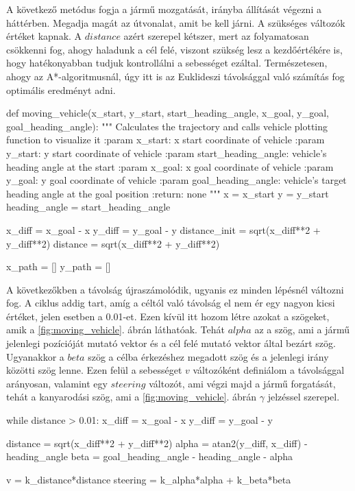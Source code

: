 A következő metódus fogja a jármű mozgatását, irányba állítását végezni a háttérben. Megadja magát az útvonalat, amit be kell járni. A szükséges változók értéket kapnak. A $ distance $ azért szerepel kétszer, mert az folyamatosan csökkenni fog, ahogy haladunk a cél felé, viszont szükség lesz a kezdőértékére is, hogy hatékonyabban tudjuk kontrollálni a sebességet ezáltal. Természetesen, ahogy az A*-algoritmusnál, úgy itt is az Euklideszi távolsággal való számítás fog optimális eredményt adni.
\begin{python}
def moving_vehicle(x_start, y_start, start_heading_angle, x_goal,
 y_goal, goal_heading_angle):
    """
    Calculates the trajectory and calls vehicle plotting
    function to visualize it
    :param x_start: x start coordinate of vehicle
    :param y_start: y start coordinate of vehicle
    :param start_heading_angle: vehicle's heading angle at the start
    :param x_goal: x goal coordinate of vehicle
    :param y_goal: y goal coordinate of vehicle
    :param goal_heading_angle: vehicle's target heading angle
    at the goal position
    :return: none
    """
    x = x_start
    y = y_start
    heading_angle = start_heading_angle

    x_diff = x_goal - x
    y_diff = y_goal - y
    distance_init = sqrt(x_diff**2 + y_diff**2)
    distance = sqrt(x_diff**2 + y_diff**2)

    x_path = []
    y_path = []
\end{python}

\bigskip

A következőkben a távolság újraszámolódik, ugyanis ez minden lépésnél változni fog. A ciklus addig tart, amíg a céltól való távolság el nem ér egy nagyon kicsi értéket, jelen esetben a 0.01-et. Ezen kívül itt hozom létre azokat a szögeket, amik a \ref{fig:moving_vehicle}. ábrán láthatóak. Tehát $ alpha $ az a szög, ami a jármű jelenlegi pozícióját mutató vektor és a cél felé mutató vektor által bezárt szög. Ugyanakkor a $ beta $ szög a célba érkezéshez megadott szög és a jelenlegi irány közötti szög lenne. Ezen felül a sebességet $ v $ változóként definiálom a távolsággal arányosan, valamint egy $ steering $ változót, ami végzi majd a jármű forgatását, tehát a kanyarodási szög, ami a \ref{fig:moving_vehicle}. ábrán $ \gamma $ jelzéssel szerepel.
\begin{python}
while distance > 0.01:
    x_diff = x_goal - x
    y_diff = y_goal - y

    distance = sqrt(x_diff**2 + y_diff**2)
    alpha = atan2(y_diff, x_diff) - heading_angle
    beta = goal_heading_angle - heading_angle - alpha

    v = k_distance*distance
    steering = k_alpha*alpha + k_beta*beta
\end{python}

